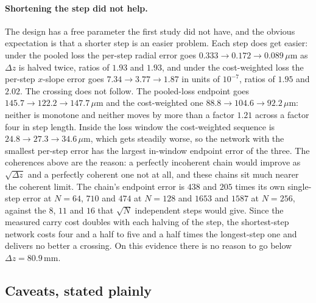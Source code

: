\documentclass[11pt,a4paper]{article}
\newcommand{\um}{\ensuremath{\,\mu\mathrm{m}}}
\newcommand{\mm}{\ensuremath{\,\mathrm{mm}}}
\begin{document}
\paragraph{Shortening the step did not help.} The design has a free parameter
the first study did not have, and the obvious expectation is that a shorter
step is an easier problem. Each step does get easier: under the pooled loss the
per-step radial error goes $0.333 \to 0.172 \to 0.089\um$ as $\Delta z$ is
halved twice, ratios of $1.93$ and $1.93$, and under the cost-weighted loss the
per-step $x$-slope error goes $7.34 \to 3.77 \to 1.87$ in units of $10^{-7}$,
ratios of $1.95$ and $2.02$. The crossing does not follow. The pooled-loss
endpoint goes $145.7 \to 122.2 \to 147.7\um$ and the cost-weighted one
$88.8 \to 104.6 \to 92.2\um$: neither is monotone and neither moves by more
than a factor $1.21$ across a factor four in step length. Inside the loss
window the cost-weighted sequence is $24.8 \to 27.3 \to 34.6\um$, which gets
steadily worse, so the network with the smallest per-step error has the largest
in-window endpoint error of the three. The coherences above are the reason: a
perfectly incoherent chain would improve as $\sqrt{\Delta z}$ and a perfectly
coherent one not at all, and these chains sit much nearer the coherent limit.
The chain's endpoint error is $438$ and $205$ times its own single-step error
at $N = 64$, $710$ and $474$ at $N = 128$ and $1653$ and $1587$ at $N = 256$,
against the $8$, $11$ and $16$ that $\sqrt{N}$ independent steps would give.
Since the measured carry cost doubles with each halving of the step, the
shortest-step network costs four and a half to five and a half times the
longest-step one and delivers no better a crossing. On this evidence there is
no reason to go below $\Delta z = 80.9\mm$.

\subsection{Caveats, stated plainly}
\label{sec:discussion-caveats}
\end{document}
